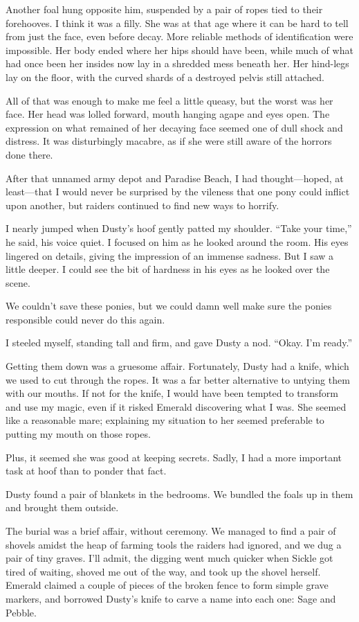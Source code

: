 Another foal hung opposite him, suspended by a pair of ropes tied to their forehooves. I think it was a filly. She was at that age where it can be hard to tell from just the face, even before decay. More reliable methods of identification were impossible. Her body ended where her hips should have been, while much of what had once been her insides now lay in a shredded mess beneath her. Her hind-legs lay on the floor, with the curved shards of a destroyed pelvis still attached.

All of that was enough to make me feel a little queasy, but the worst was her face. Her head was lolled forward, mouth hanging agape and eyes open. The expression on what remained of her decaying face seemed one of dull shock and distress. It was disturbingly macabre, as if she were still aware of the horrors done there.

After that unnamed army depot and Paradise Beach, I had thought—hoped, at least—that I would never be surprised by the vileness that one pony could inflict upon another, but raiders continued to find new ways to horrify.

I nearly jumped when Dusty’s hoof gently patted my shoulder. “Take your time,” he said, his voice quiet. I focused on him as he looked around the room. His eyes lingered on details, giving the impression of an immense sadness. But I saw a little deeper. I could see the bit of hardness in his eyes as he looked over the scene.

We couldn’t save these ponies, but we could damn well make sure the ponies responsible could never do this again.

I steeled myself, standing tall and firm, and gave Dusty a nod. “Okay. I’m ready.”

Getting them down was a gruesome affair. Fortunately, Dusty had a knife, which we used to cut through the ropes. It was a far better alternative to untying them with our mouths. If not for the knife, I would have been tempted to transform and use my magic, even if it risked Emerald discovering what I was. She seemed like a reasonable mare; explaining my situation to her seemed preferable to putting my mouth on those ropes.

Plus, it seemed she was good at keeping secrets. Sadly, I had a more important task at hoof than to ponder that fact.

Dusty found a pair of blankets in the bedrooms. We bundled the foals up in them and brought them outside.

The burial was a brief affair, without ceremony. We managed to find a pair of shovels amidst the heap of farming tools the raiders had ignored, and we dug a pair of tiny graves. I’ll admit, the digging went much quicker when Sickle got tired of waiting, shoved me out of the way, and took up the shovel herself. Emerald claimed a couple of pieces of the broken fence to form simple grave markers, and borrowed Dusty’s knife to carve a name into each one: Sage and Pebble.


